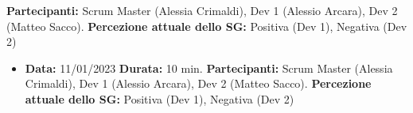 \documentclass[a4paper, oneside]{article}
\newcommand\cinque{Scrum Master (Alessia Crimaldi), Dev 1 (Alessio Arcara), Dev 2 (Matteo Sacco).}
\begin{document}
\begin{landscape}
\begin{itemize}
            \newline \textbf{Partecipanti:} \cinque
            \newline \textbf{Percezione attuale dello SG:} Positiva (Dev 1), Negativa (Dev 2)
        \end{itemize}
        \begin{itemize}
            \item \textbf{Data:} 11/01/2023
            \newline \textbf{Durata:} 10 min.
            \newline \textbf{Partecipanti:} \cinque
            \newline \textbf{Percezione attuale dello SG:} Positiva (Dev 1), Negativa (Dev 2)
        \end{itemize}

        \newpage

\end{landscape}
\end{document}
